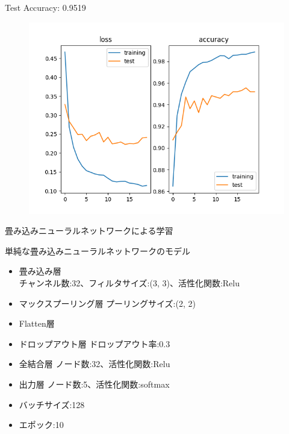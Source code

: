 \documentclass[dvipdfmx]{beamer}
\begin{document}
  \begin{frame}
    Test Accuracy: 0.9519
    \begin{figure}[H]
      \centering
      \includegraphics[keepaspectratio, scale=0.6]{images/train_fnn_my_amino_img.png}
    \end{figure}
  \end{frame}

  \begin{frame}{畳み込みニューラルネットワークによる学習}
    \begin{block}{単純な畳み込みニューラルネットワークのモデル}
      \begin{itemize}
        \item 畳み込み層 \mbox{}\\チャンネル数:32、フィルタサイズ:(3, 3)、活性化関数:Relu
        \item マックスプーリング層 \mbox{}プーリングサイズ:(2, 2)
        \item Flatten層
        \item ドロップアウト層 \mbox{}ドロップアウト率:0.3
        \item 全結合層 \mbox{}ノード数:32、活性化関数:Relu
        \item 出力層 \mbox{}ノード数:5、活性化関数:softmax
        \item バッチサイズ:128
        \item エポック:10
      \end{itemize}
    \end{block}
  \end{frame}
\end{document}
